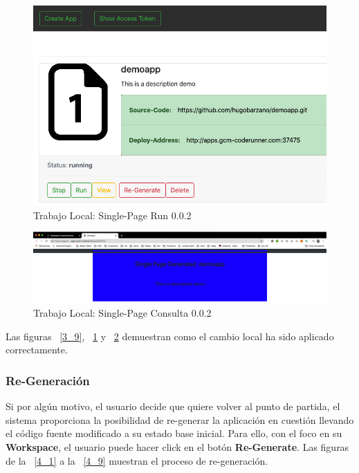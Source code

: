 \documentclass[a4paper,11pt]{book}
\begin{document}
\begin{figure}[H]
\centering
\includegraphics[scale=0.4]{imagenes/casouso_a/3_10.png}
\caption{  Trabajo Local: Single-Page Run 0.0.2 }
\label{3_10}
\end{figure}
 
 \begin{figure}[H]
\centering
\includegraphics[scale=0.22]{imagenes/casouso_a/3_11.png}
\caption{   Trabajo Local: Single-Page Consulta 0.0.2}
\label{3_11}
\end{figure}

Las figuras ~\ref{3_9},  ~\ref{3_10}  y  ~\ref{3_11} demuestran como el cambio local ha sido aplicado correctamente.


\subsubsection{Re-Generación}

Si por algún motivo, el usuario decide que quiere volver al punto de partida, el sistema proporciona la posibilidad de re-generar la aplicación en cuestión llevando el código fuente modificado a su estado base inicial. Para ello, con el foco en su \textbf{Workspace}, el usuario puede hacer click en el botón \textbf{Re-Generate}. Las figuras de la ~\ref{4_1}  a la ~\ref{4_9} muestran el proceso de re-generación. 
\end{document}
